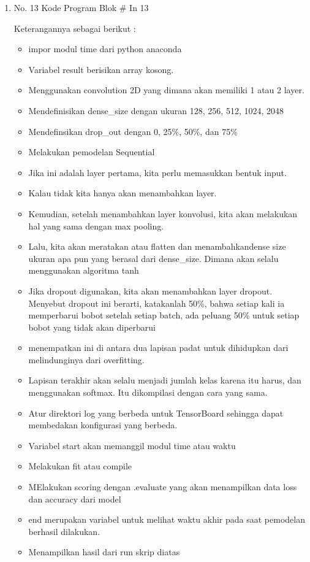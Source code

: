 \begin{enumerate}
\item No. 13 Kode Program Blok \# In 13
\par 
Keterangannya sebagai berikut :
\begin{itemize}
\item impor modul time dari python anaconda
\item Variabel result berisikan array kosong.
\item Menggunakan convolution 2D yang dimana akan memiliki 1 atau 2 layer.
\item Mendefinisikan dense\_size dengan ukuran 128, 256, 512, 1024, 2048
\item Mendefinsikan drop\_out dengan 0, 25\%, 50\%, dan 75\%
\item Melakukan pemodelan Sequential
\item Jika ini adalah layer pertama, kita perlu memasukkan bentuk input.
\item Kalau tidak kita hanya akan menambahkan layer.
\item Kemudian, setelah menambahkan layer konvolusi, kita akan melakukan hal yang sama dengan max pooling.
\item  Lalu, kita akan meratakan atau flatten dan menambahkandense size ukuran apa pun yang berasal dari dense\_size. Dimana akan selalu menggunakan algoritma tanh
\item Jika dropout digunakan, kita akan menambahkan layer dropout. Menyebut dropout ini berarti, katakanlah 50\%, bahwa setiap kali ia memperbarui bobot setelah setiap batch, ada peluang 50\% untuk setiap bobot yang tidak akan diperbarui
\item menempatkan ini di antara dua lapisan padat untuk dihidupkan dari melindunginya dari overfitting.
\item  Lapisan terakhir akan selalu menjadi jumlah kelas karena itu harus, dan menggunakan softmax. Itu dikompilasi dengan cara yang sama.
\item Atur direktori log yang berbeda untuk TensorBoard sehingga dapat membedakan konfigurasi yang berbeda.
\item Variabel start akan memanggil modul time atau waktu
\item Melakukan fit atau compile 
\item MElakukan scoring dengan .evaluate yang akan menampilkan data loss dan accuracy dari model
\item end merupakan variabel untuk melihat waktu akhir pada saat pemodelan berhasil dilakukan.
\item Menampilkan hasil dari run skrip diatas
\end{itemize}


\end{enumerate}
